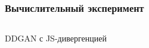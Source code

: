 \documentclass[8pt]{beamer}
\begin{document}
\begin{frame}
	\frametitle{Вычислительный эксперимент}
	\begin{columns}
		\begin{column}{0.8\textwidth}
			\begin{block}{DDGAN с JS-дивергенцией}
				\begin{figure}[H]
				\end{figure}
			\end{block}
		\end{column}
		\begin{column}{0.23\textwidth}
			\begin{figure}[H]
				

\end{figure}
\end{column}
\end{columns}
\end{frame}
\end{document}
